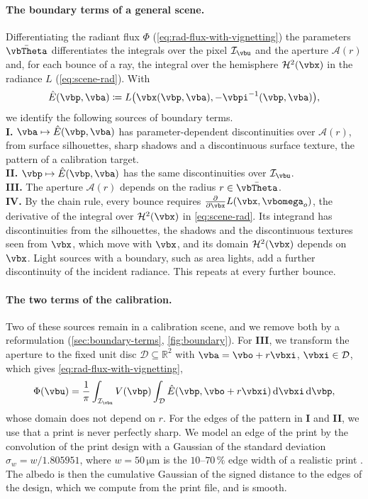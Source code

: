 \paragraph{The boundary terms of a general scene.}
Differentiating the radiant flux $\Phi$
(\cref{eq:rad-flux-with-vignetting}) \wrt the parameters
$\bar{\vbTheta}$ differentiates the integrals over the pixel
$\mathcal{I}_{\vbu}$ and the aperture $\mathcal{A}(r)$ and, for each
bounce of a ray, the integral over the hemisphere
$\mathcal{H}^2(\vbx)$ in the radiance $L$ (\cref{eq:scene-rad}). With
\begin{align*}
    \hat{E}(\vbp,\vba)\coloneqq L\bigl(\vbx(\vbp,\vba),-\vbpi^{-1}(\vbp,\vba)\bigr),
\end{align*}
we identify the following sources of boundary terms.\\
\textbf{I.} $\vba \mapsto \hat{E}(\vbp,\vba)$ has parameter-dependent
discontinuities over $\mathcal{A}(r)$, from surface silhouettes,
sharp shadows and a discontinuous surface texture, \eg the pattern
of a calibration target.\\
\textbf{II.} $\vbp \mapsto \hat{E}(\vbp,\vba)$ has the same
discontinuities over $\mathcal{I}_{\vbu}$.\\
\textbf{III.} The aperture $\mathcal{A}(r)$ depends on the radius
$r\in\bar{\vbTheta}$.\\
\textbf{IV.} By the chain rule, every bounce requires
$\frac{\partial}{\partial \vbx}L(\vbx,\vbomega_o)$, the derivative of
the integral over $\mathcal{H}^2(\vbx)$ in \cref{eq:scene-rad}. Its
integrand has discontinuities from the silhouettes, the shadows and
the discontinuous textures seen from $\vbx$, which move with $\vbx$,
and its domain $\mathcal{H}^2(\vbx)$ depends on $\vbx$. Light sources
with a boundary, such as area lights, add a further discontinuity of
the incident radiance. This repeats at every further bounce.

\paragraph{The two terms of the calibration.}
Two of these sources remain in a calibration scene, and we remove
both by a reformulation (\cref{sec:boundary-terms},
\cref{fig:boundary}). For \textbf{III}, we transform the aperture to
the fixed unit disc $\mathcal{D}\subseteq\mathbb{R}^2$ with
$\vba=\vbo+r\vbxi$, $\vbxi\in\mathcal{D}$, which gives
\cref{eq:rad-flux-with-vignetting},
\begin{align*}
    \Phi(\vbu)
    =\frac{1}{\pi}\int_{\mathcal{I}_{\vbu}}V(\vbp)
    \int_{\mathcal{D}} \hat{E}(\vbp,\vbo+r\vbxi)\odif{\vbxi}\odif{\vbp},
\end{align*}
whose domain does not depend on $r$. For the edges of the pattern in
\textbf{I} and \textbf{II}, we use that a print is never perfectly
sharp. We model an edge of the print by the convolution of the print
design with a Gaussian of the standard deviation
$\sigma_w = w/1.805951$, where $w=50\,\mathrm{\mu m}$ is the
$10$--$70\,\%$ edge width of a realistic print
\cite{rosalen2019cardboards}. The albedo is then the cumulative
Gaussian of the signed distance to the edges of the design, which we
compute from the print file, and is smooth.


